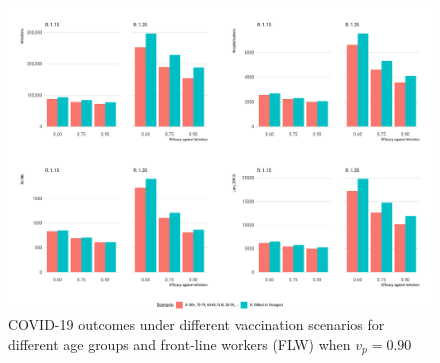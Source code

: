 \documentclass[]{elsarticle} %
\begin{document}
\begin{figure}[htb]
\begin{center}
\includegraphics[width=6in]{"../figures/vp0.60/fig-barplots.pdf"}
\caption{COVID-19 outcomes under different vaccination scenarios for different age groups and front-line workers (FLW) when $v_p=0.90$}
\end{center}
\end{figure}
\end{document}

